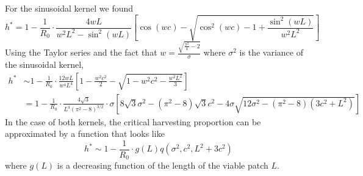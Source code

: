 \documentclass[12pt,english]{article}
\begin{document}
For the sinusoidal kernel we found 
\begin{equation}
h^*=1-\frac{1}{R_0}\cdot\frac{4wL}{w^2L^2-\sin^2(wL)}\left[\cos(wc)-\sqrt{\cos^2(wc)-1+\frac{\sin^2(wL)}{w^2L^2}}\right] 
\end{equation} 
Using the Taylor series and the fact that $w=\frac{\sqrt{\frac{\pi^2}{4}-2}}{\sigma}$ where $\sigma^2$ is the variance of the sinusoidal kernel,
\begin{align*}
h^*&\sim 1-\frac{1}{R_0}\cdot\frac{12wL}{w^4L^4}\left[1-\frac{w^2c^2}{2}-\sqrt{1-w^2c^2-\frac{w^2L^2}{3}}\right]
\\&=1-\frac{1}{R_0}\cdot\frac{4\sqrt{3}}{L^3(\pi^2-8)^{3/2}}\cdot\sigma\left[8\sqrt{3}\sigma^2-(\pi^2-8)\sqrt{3}c^2-4\sigma\sqrt{12\sigma^2-(\pi^2-8)(3c^2+L^2)}\right]
\end{align*}
In the case of both kernels, the critical harvesting proportion can be approximated by a function that looks like 
\begin{equation}
h^*\sim1- \frac{1}{R_0}\cdot g(L)q(\sigma^2,c^2,L^2+3c^2)
\end{equation}
where $g(L)$ is a decreasing function of the length of the viable patch $L$.

\pagebreak
\end{document}
